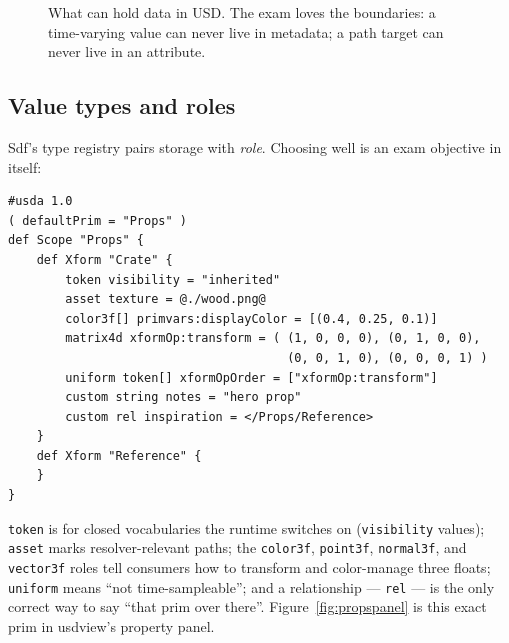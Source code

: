 \begin{figure}[ht]
  \centering
  \caption{What can hold data in USD. The exam loves the boundaries: a
  time-varying value can never live in metadata; a path target can never live
  in an attribute.}
  \label{fig:prop-taxonomy}
\end{figure}

\subsection{Value types and roles}\label{sec:dm-types}
Sdf's type registry pairs storage with \emph{role}. Choosing well is an exam
objective in itself:

\begin{lstlisting}
#usda 1.0
( defaultPrim = "Props" )
def Scope "Props" {
    def Xform "Crate" {
        token visibility = "inherited"
        asset texture = @./wood.png@
        color3f[] primvars:displayColor = [(0.4, 0.25, 0.1)]
        matrix4d xformOp:transform = ( (1, 0, 0, 0), (0, 1, 0, 0),
                                       (0, 0, 1, 0), (0, 0, 0, 1) )
        uniform token[] xformOpOrder = ["xformOp:transform"]
        custom string notes = "hero prop"
        custom rel inspiration = </Props/Reference>
    }
    def Xform "Reference" {
    }
}
\end{lstlisting}

\noindent\texttt{token} is for closed vocabularies the runtime switches on
(\texttt{visibility} values); \texttt{asset} marks resolver-relevant paths;
the \texttt{color3f}, \texttt{point3f}, \texttt{normal3f}, and
\texttt{vector3f} roles tell consumers how to transform and color-manage
three floats;
\texttt{uniform} means ``not time-sampleable''; and a relationship ---
\texttt{rel} --- is the only correct way to say ``that prim over there''.
Figure~\ref{fig:propspanel} is this exact prim in usdview's property panel.

